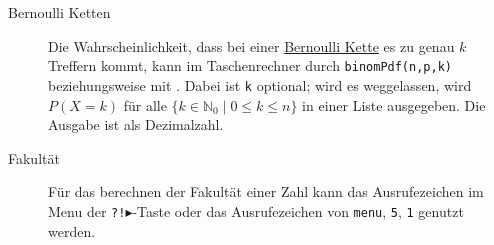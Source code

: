 \documentclass{article}
\begin{document}
\begin{description}
 \item[Bernoulli Ketten] Die Wahrscheinlichkeit, dass bei einer \hyperref[Bernoulli Ketten]{Bernoulli Kette} es zu genau $k$ Treffern kommt, kann im Taschenrechner durch \texttt{binomPdf(n,p,k)} beziehungsweise mit  \arrow {} \arrow {} \arrow {}. Dabei ist \texttt{k} optional; wird es weggelassen, wird $P(X=k)$ für alle $\{k \in \mathbb{N}_0 \mid 0 \leq k \leq n\}$ in einer Liste ausgegeben. Die Ausgabe ist als Dezimalzahl.
 \item[Fakultät] Für das berechnen der Fakultät einer Zahl kann das Ausrufezeichen im Menu der \texttt{?!$\blacktriangleright$}-Taste oder das Ausrufezeichen von \texttt{menu}, \texttt{5}, \texttt{1} genutzt werden. 
\end{description} 
\end{document}
